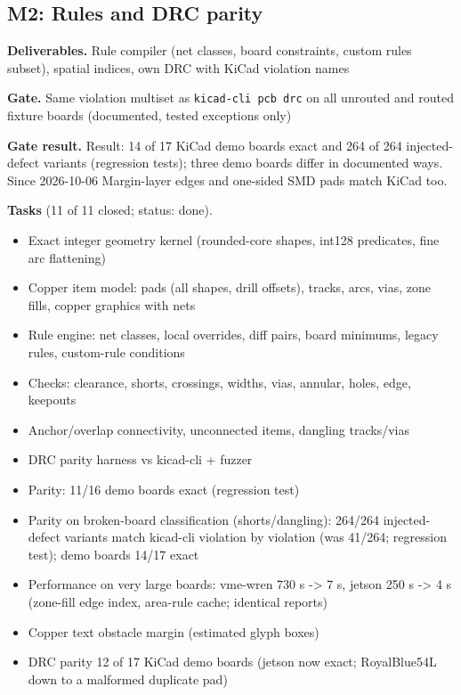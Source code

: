 \subsection*{M2: Rules and DRC parity}
\noindent\textbf{Deliverables.} Rule compiler (net classes, board constraints, custom rules subset), spatial indices, own DRC with KiCad violation names\par\smallskip
\noindent\textbf{Gate.} Same violation multiset as \texttt{kicad-cli pcb drc} on all unrouted and routed fixture boards (documented, tested exceptions only)\par\smallskip
\noindent\colorbox{boxfill}{\parbox{\dimexpr\linewidth-2\fboxsep}{\textbf{Gate result.} Result: 14 of 17 KiCad demo boards exact and 264 of 264 injected-defect variants (regression tests); three demo boards differ in documented ways. Since 2026-10-06 Margin-layer edges and one-sided SMD pads match KiCad too.}}\par\smallskip
\noindent\textbf{Tasks} (11 of 11 closed; status: done).
\begin{itemize}[leftmargin=1.6em,itemsep=1pt]
\item[\textcolor{fraqua}{$\checkmark$}] Exact integer geometry kernel (rounded-core shapes, int128 predicates, fine arc flattening)
\item[\textcolor{fraqua}{$\checkmark$}] Copper item model: pads (all shapes, drill offsets), tracks, arcs, vias, zone fills, copper graphics with nets
\item[\textcolor{fraqua}{$\checkmark$}] Rule engine: net classes, local overrides, diff pairs, board minimums, legacy rules, custom-rule conditions
\item[\textcolor{fraqua}{$\checkmark$}] Checks: clearance, shorts, crossings, widths, vias, annular, holes, edge, keepouts
\item[\textcolor{fraqua}{$\checkmark$}] Anchor/overlap connectivity, unconnected items, dangling tracks/vias
\item[\textcolor{fraqua}{$\checkmark$}] DRC parity harness vs kicad-cli + fuzzer
\item[\textcolor{fraqua}{$\checkmark$}] Parity: 11/16 demo boards exact (regression test)
\item[\textcolor{fraqua}{$\checkmark$}] Parity on broken-board classification (shorts/dangling): 264/264 injected-defect variants match kicad-cli violation by violation (was 41/264; regression test); demo boards 14/17 exact
\item[\textcolor{fraqua}{$\checkmark$}] Performance on very large boards: vme-wren 730 s -\textgreater{} 7 s, jetson 250 s -\textgreater{} 4 s (zone-fill edge index, area-rule cache; identical reports)
\item[\textcolor{fraqua}{$\checkmark$}] Copper text obstacle margin (estimated glyph boxes)
\item[\textcolor{fraqua}{$\checkmark$}] DRC parity 12 of 17 KiCad demo boards (jetson now exact; RoyalBlue54L down to a malformed duplicate pad)
\end{itemize}
